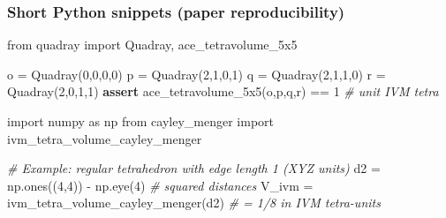 \documentclass[
  10pt,
]{article}
\newenvironment{Shaded}{}{}
\newcommand{\CommentTok}[1]{\textcolor[rgb]{0.38,0.63,0.69}{\textit{#1}}}
\newcommand{\ControlFlowTok}[1]{\textcolor[rgb]{0.00,0.44,0.13}{\textbf{#1}}}
\newcommand{\DecValTok}[1]{\textcolor[rgb]{0.25,0.63,0.44}{#1}}
\newcommand{\ImportTok}[1]{#1}
\newcommand{\NormalTok}[1]{#1}
\newcommand{\OperatorTok}[1]{\textcolor[rgb]{0.40,0.40,0.40}{#1}}
\begin{document}
\hypertarget{short-python-snippets-paper-reproducibility}{%
\subsubsection{Short Python snippets (paper
reproducibility)}\label{short-python-snippets-paper-reproducibility}}

\begin{Shaded}
\begin{Highlighting}[]
\ImportTok{from}\NormalTok{ quadray }\ImportTok{import}\NormalTok{ Quadray, ace\_tetravolume\_5x5}

\NormalTok{o }\OperatorTok{=}\NormalTok{ Quadray(}\DecValTok{0}\NormalTok{,}\DecValTok{0}\NormalTok{,}\DecValTok{0}\NormalTok{,}\DecValTok{0}\NormalTok{)}
\NormalTok{p }\OperatorTok{=}\NormalTok{ Quadray(}\DecValTok{2}\NormalTok{,}\DecValTok{1}\NormalTok{,}\DecValTok{0}\NormalTok{,}\DecValTok{1}\NormalTok{)}
\NormalTok{q }\OperatorTok{=}\NormalTok{ Quadray(}\DecValTok{2}\NormalTok{,}\DecValTok{1}\NormalTok{,}\DecValTok{1}\NormalTok{,}\DecValTok{0}\NormalTok{)}
\NormalTok{r }\OperatorTok{=}\NormalTok{ Quadray(}\DecValTok{2}\NormalTok{,}\DecValTok{0}\NormalTok{,}\DecValTok{1}\NormalTok{,}\DecValTok{1}\NormalTok{)}
\ControlFlowTok{assert}\NormalTok{ ace\_tetravolume\_5x5(o,p,q,r) }\OperatorTok{==} \DecValTok{1}  \CommentTok{\# unit IVM tetra}
\end{Highlighting}
\end{Shaded}

\begin{Shaded}
\begin{Highlighting}[]
\ImportTok{import}\NormalTok{ numpy }\ImportTok{as}\NormalTok{ np}
\ImportTok{from}\NormalTok{ cayley\_menger }\ImportTok{import}\NormalTok{ ivm\_tetra\_volume\_cayley\_menger}

\CommentTok{\# Example: regular tetrahedron with edge length 1 (XYZ units)}
\NormalTok{d2 }\OperatorTok{=}\NormalTok{ np.ones((}\DecValTok{4}\NormalTok{,}\DecValTok{4}\NormalTok{)) }\OperatorTok{{-}}\NormalTok{ np.eye(}\DecValTok{4}\NormalTok{)  }\CommentTok{\# squared distances}
\NormalTok{V\_ivm }\OperatorTok{=}\NormalTok{ ivm\_tetra\_volume\_cayley\_menger(d2)   }\CommentTok{\# = 1/8 in IVM tetra{-}units}
\end{Highlighting}
\end{Shaded}
\end{document}
